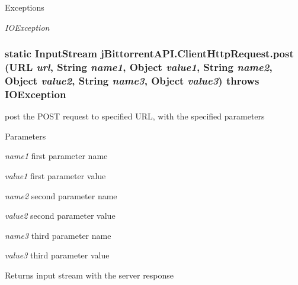 \begin{DoxyExceptions}{Exceptions}
\item[{\em IOException}]\end{DoxyExceptions}
\hypertarget{classj_bittorrent_a_p_i_1_1_client_http_request_ab63b1b9ef7fe878481a981c5f6e3b671}{
\subsubsection[{post}]{\setlength{\rightskip}{0pt plus 5cm}static InputStream jBittorrentAPI.ClientHttpRequest.post (URL {\em url}, \/  String {\em name1}, \/  Object {\em value1}, \/  String {\em name2}, \/  Object {\em value2}, \/  String {\em name3}, \/  Object {\em value3})  throws IOException }}
\label{classj_bittorrent_a_p_i_1_1_client_http_request_ab63b1b9ef7fe878481a981c5f6e3b671}
post the POST request to specified URL, with the specified parameters 
\begin{DoxyParams}{Parameters}
\item[{\em name1}]first parameter name \item[{\em value1}]first parameter value \item[{\em name2}]second parameter name \item[{\em value2}]second parameter value \item[{\em name3}]third parameter name \item[{\em value3}]third parameter value \end{DoxyParams}
\begin{DoxyReturn}{Returns}
input stream with the server response 
\end{DoxyReturn}

